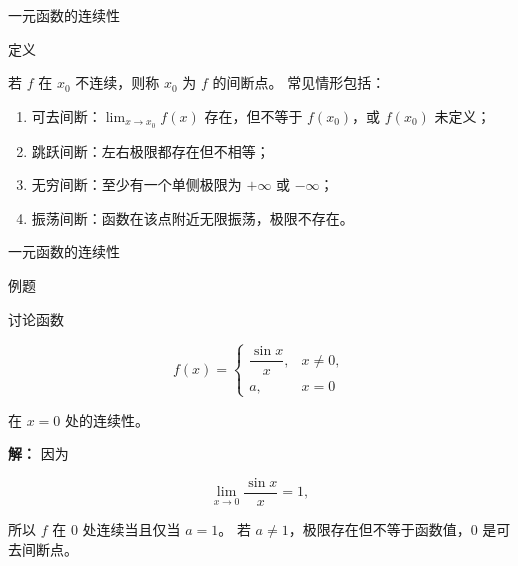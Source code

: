 \documentclass[aspectratio=169,10pt,fontset=fandol]{ctexbeamer}
\begin{document}
\begin{frame}[t,fragile]{一元函数的连续性}
\normalsize
\begin{block}{定义}
{\normalsize


若 $f$ 在 $x_0$ 不连续，则称 $x_0$ 为 $f$ 的间断点。 常见情形包括：

\begin{enumerate}[label=(\arabic*),leftmargin=2em]

\item 可去间断：$\lim_{x\to x_0}f(x)$ 存在，但不等于 $f(x_0)$，或 $f(x_0)$ 未定义；

\item 跳跃间断：左右极限都存在但不相等；

\item 无穷间断：至少有一个单侧极限为 \(+\infty\) 或 \(-\infty\)；

\item 振荡间断：函数在该点附近无限振荡，极限不存在。

\end{enumerate}


}
\end{block}
\end{frame}
\begin{frame}[t,fragile]{一元函数的连续性}
\normalsize
\begin{block}{例题}
{\normalsize
讨论函数

\[

f(x)=

\begin{cases}

\dfrac{\sin x}{x},&x\neq0,\\

a,&x=0

\end{cases}

\]

在 $x=0$ 处的连续性。


}
\end{block}
\pause
{\normalsize
\textbf{解：}
因为

\[

\lim_{x\to0}\frac{\sin x}{x}=1,

\]

所以 $f$ 在 $0$ 处连续当且仅当 $a=1$。 若 $a\neq1$，极限存在但不等于函数值，$0$ 是可去间断点。


}
\end{frame}
\end{document}
